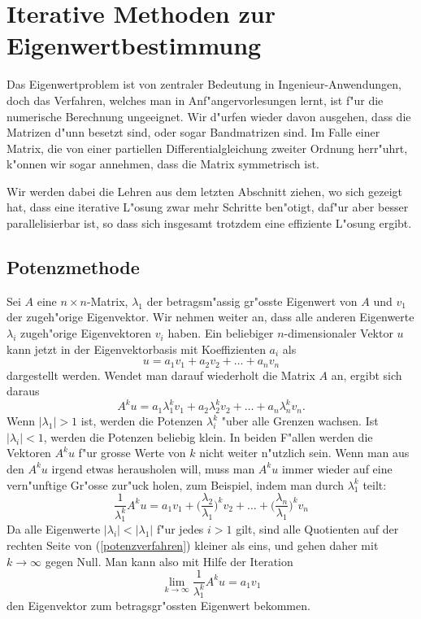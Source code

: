 
\section{Iterative Methoden zur Eigenwertbestimmung}
Das Eigenwertproblem ist von zentraler Bedeutung in Ingenieur-Anwendungen,
doch das Verfahren, welches man in Anf"angervorlesungen lernt, ist f"ur die
numerische Berechnung ungeeignet.
Wir d"urfen wieder davon ausgehen, dass die Matrizen d"unn besetzt sind, oder
sogar Bandmatrizen sind.
Im Falle einer Matrix, die von einer partiellen Differentialgleichung
zweiter Ordnung herr"uhrt, k"onnen wir sogar annehmen, dass die
Matrix symmetrisch ist.

Wir werden dabei die Lehren aus dem letzten Abschnitt ziehen, wo sich
gezeigt hat, dass eine iterative L"osung zwar mehr Schritte ben"otigt,
daf"ur aber besser parallelisierbar ist, so dass sich insgesamt trotzdem
eine effiziente L"osung ergibt.

\subsection{Potenzmethode}
Sei $A$ eine $n\times n$-Matrix, $\lambda_1$ der betragsm"assig
gr"osste Eigenwert von $A$ und $v_1$ der zugeh"orige Eigenvektor.
Wir nehmen weiter an, dass alle anderen Eigenwerte $\lambda_i$ zugeh"orige
Eigenvektoren $v_i$ haben. Ein beliebiger $n$-dimensionaler Vektor $u$
kann jetzt in der Eigenvektorbasis mit Koeffizienten $a_i$ als
\[
u=
a_1v_1+a_2v_2+\dots+a_nv_n
\]
dargestellt werden.
Wendet man darauf wiederholt die Matrix $A$ an, ergibt sich daraus
\[
A^ku=
a_1\lambda_1^kv_1
+
a_2\lambda_2^kv_2
+
\dots
+
a_n\lambda_n^kv_n.
\]
Wenn $|\lambda_1| > 1$ ist, werden die Potenzen $\lambda_i^k$ "uber
alle Grenzen wachsen.
Ist $|\lambda_i|<1$, werden die Potenzen beliebig klein.
In beiden F"allen werden die Vektoren $A^ku$ f"ur grosse Werte von $k$
nicht weiter n"utzlich sein.
Wenn man aus den $A^ku$ irgend etwas herausholen will, muss man $A^ku$ 
immer wieder auf eine vern"unftige Gr"osse zur"uck holen, zum Beispiel,
indem man durch $\lambda_1^k$ teilt:
\begin{equation}
\frac1{\lambda_1^k}A^ku=a_1v_1
+\biggl(\frac{\lambda_2}{\lambda_1}\biggr)^kv_2
+\dots+
\biggl(\frac{\lambda_n}{\lambda_1}\biggr)^kv_n
\label{potenzverfahren}
\end{equation}
Da alle Eigenwerte $|\lambda_i|<|\lambda_1|$ f"ur jedes $i>1$ gilt,
sind alle Quotienten auf der rechten Seite von (\ref{potenzverfahren})
kleiner als eins, und gehen daher mit $k\to\infty$ gegen Null. Man kann
also mit Hilfe der Iteration
\[
\lim_{k\to\infty}\frac1{\lambda_1^k}A^ku=a_1v_1
\]
den Eigenvektor zum betragsgr"ossten Eigenwert bekommen.

